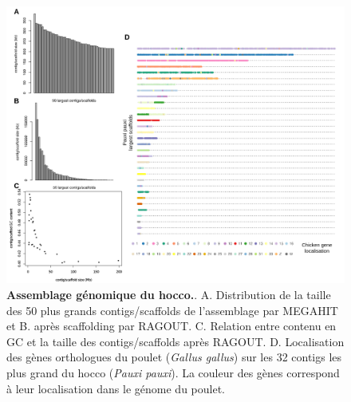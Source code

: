 \begin{figure}[h]
    \centering
    \includegraphics[width=1\textwidth, page=1] {figures/annexes/hocco-fig1.png}
    \caption[Assemblage génomique du hocco.]{
    \textbf{Assemblage génomique du hocco.}. 
    A. Distribution de la taille des 50 plus grands contigs/scaffolds de l'assemblage par MEGAHIT et
    B. après scaffolding par RAGOUT.
    C. Relation entre contenu en GC et la taille des contigs/scaffolds après RAGOUT.
    D. Localisation des gènes orthologues du poulet (\textit{Gallus gallus}) sur les 32 contigs les plus grand du hocco (\textit{Pauxi pauxi}). La couleur des gènes correspond à leur localisation dans le génome du poulet. \\
    }
    \label{fig:hocco-fig1}
\end{figure} 

